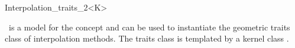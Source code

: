 

\begin{ccRefClass}{Interpolation_traits_2<K>}
  
   \ccDefinition \ccRefName\ is a model for
  the concept  and can be used to instantiate
  the geometric traits class of interpolation methods. The traits
  class is templated by a kernel class .
  

  \ccIsModel 


  \ccSeeAlso
  
  

\end{ccRefClass}


